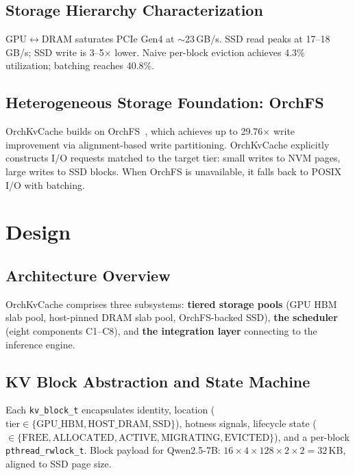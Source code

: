 \documentclass[conference]{IEEEtran}
\begin{document}
\subsection{Storage Hierarchy Characterization}
\label{sec:storage-char}


GPU$\leftrightarrow$DRAM saturates PCIe Gen4 at ${\sim}$23\,GB/s. SSD read peaks at 17--18\,GB/s; SSD write is 3--5$\times$ lower. Naive per-block eviction achieves 4.3\% utilization; batching reaches 40.8\%.

\subsection{Heterogeneous Storage Foundation: OrchFS}

OrchKvCache builds on OrchFS~\cite{orchfs}, which achieves up to 29.76$\times$ write improvement via alignment-based write partitioning. OrchKvCache explicitly constructs I/O requests matched to the target tier: small writes to NVM pages, large writes to SSD blocks. When OrchFS is unavailable, it falls back to POSIX I/O with batching.


\section{Design}

\subsection{Architecture Overview}


OrchKvCache comprises three subsystems: \textbf{tiered storage pools} (GPU HBM slab pool, host-pinned DRAM slab pool, OrchFS-backed SSD), \textbf{the scheduler} (eight components C1--C8), and \textbf{the integration layer} connecting to the inference engine.

\subsection{KV Block Abstraction and State Machine}

Each \texttt{kv\_block\_t} encapsulates identity, location ($\text{tier} \in \{\text{GPU\_HBM}, \text{HOST\_DRAM}, \text{SSD}\}$), hotness signals, lifecycle state ($\in \{\text{FREE}, \text{ALLOCATED}, \text{ACTIVE}, \text{MIGRATING}, \text{EVICTED}\}$), and a per-block \texttt{pthread\_rwlock\_t}. Block payload for Qwen2.5-7B: $16 \times 4 \times 128 \times 2 \times 2 = 32$\,KB, aligned to SSD page size.
\end{document}
